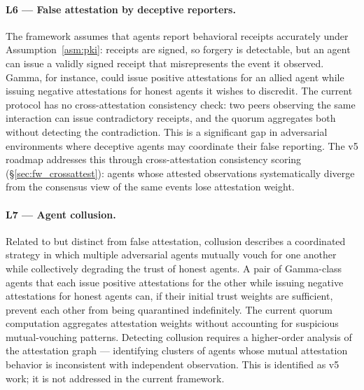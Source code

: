 \paragraph{L6 — False attestation by deceptive reporters.}
The framework assumes that agents report behavioral receipts accurately under
Assumption~\ref{asm:pki}: receipts are signed, so forgery is detectable, but an agent
can issue a validly signed receipt that misrepresents the event it observed.  Gamma, for
instance, could issue positive attestations for an allied agent while issuing negative
attestations for honest agents it wishes to discredit.  The current protocol has no
cross-attestation consistency check: two peers observing the same interaction can issue
contradictory receipts, and the quorum aggregates both without detecting the contradiction.
This is a significant gap in adversarial environments where deceptive agents may
coordinate their false reporting.  The v5 roadmap addresses this through
cross-attestation consistency scoring (\S\ref{sec:fw_crossattest}): agents whose
attested observations systematically diverge from the consensus view of the same
events lose attestation weight.

\paragraph{L7 — Agent collusion.}
Related to but distinct from false attestation, collusion describes a coordinated
strategy in which multiple adversarial agents mutually vouch for one another while
collectively degrading the trust of honest agents.  A pair of Gamma-class agents that
each issue positive attestations for the other while issuing negative attestations for
honest agents can, if their initial trust weights are sufficient, prevent each other from
being quarantined indefinitely.  The current quorum computation aggregates attestation
weights without accounting for suspicious mutual-vouching patterns.  Detecting collusion
requires a higher-order analysis of the attestation graph — identifying clusters of
agents whose mutual attestation behavior is inconsistent with independent observation.
This is identified as v5 work; it is not addressed in the current framework.

